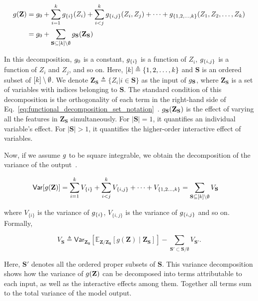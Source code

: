 \begin{align}
\function(\mathbf{Z}) &= \function_0 + \sum_{i=1}^{\numnonsensitive} \function_{\{i\}}(Z_i) +  \sum_{i < j}^{\numnonsensitive} \function_{\{i,j\}}(Z_i, Z_j)  + \cdots  + \function_{\{1, 2, \dots, \numnonsensitive\}} (Z_1, Z_2, \dots, Z_{\numnonsensitive})\notag%
\\    
&= \function_0 +  \sum_{\mathbf{S} \subseteq [\numnonsensitive] \setminus \emptyset} \function_{\mathbf{S}}(\mathbf{Z}_{\mathbf{S}})\label{eq:functional_decomposition_set_notation}
\end{align}

In this decomposition, $ g_0 $ is a constant, $ g_{\{i\}} $ is a function of $ Z_i $, $ g_{\{i,j\}} $ is a function of $ Z_i $ and $ Z_j $, and so on. Here, $ [k] \triangleq \{1,2,\dots, k\} $ and $ \mathbf{S}$ is an ordered subset of $[k] \setminus \emptyset $.  We denote $ \mathbf{Z}_{\mathbf{S}}  \triangleq \{Z_i | i \in \mathbf{S}\}$ as the input of $ g_{\mathbf{S}} $, where $ \mathbf{Z}_{\mathbf{S}}$ is a set of variables with indices belonging to $ \mathbf{S} $.  The standard condition of this decomposition is the orthogonality of each term in the right-hand side of Eq.~\eqref{eq:functional_decomposition_set_notation}~\cite{sobol1990sensitivity}. $ g_{\mathbf{S}}(\mathbf{Z}_{\mathbf{S}}) $ is the effect of varying all the features in $\mathbf{Z}_{\mathbf{S}}$ simultaneously. %
For $|\mathbf{S}|=1$, it quantifies an individual variable's effect. For $|\mathbf{S}|>1$, it quantifies the higher-order interactive effect of variables.

Now, if we assume $ g $ to be square integrable, we obtain the decomposition of the variance of the output~\cite{sobol1990sensitivity}.

\begin{align}\label{eq:variance_decomposition_set_notation}
\mathsf{Var}[g(\mathbf{Z})] &= \sum_{i=1}^{k}V_{\{i\}} +  \sum_{i<j}^{k} V_{\{i,j\}}  + \cdots  + V_{\{1, 2\dots, k\}}= \sum_{\mathbf{S} \subseteq [k] \setminus \emptyset} V_{\mathbf{S}} 
\end{align}

where $ V_{\{i\}} $ is the variance of $ g_{\{i\}} $, $ V_{\{i,j\}} $ is the variance of $ g_{\{i,j\}} $ and so on. Formally,  

\[ V_{\mathbf{S}} \triangleq \mathsf{Var} _{\mathbf{Z}_{\mathbf{S}}}\left[\mathbb{E}_{{\textbf {Z}}/\mathbf{Z}_{\mathbf{S}}}[g(\mathbf{Z})\mid \mathbf{Z}_{\mathbf{S}}]\right]- \sum_{\mathbf{S}' \subset \mathbf{S}/\emptyset}{V} _{\mathbf{S}'}.\] 

Here, $\mathbf{S}'$ denotes all the ordered proper subsets of $\mathbf{S}$. %
This variance decomposition shows how the variance of $g(\mathbf{Z}) $ can be decomposed into terms attributable to each input, as well as the interactive effects among them. Together all terms sum to the total variance of the model output. 




